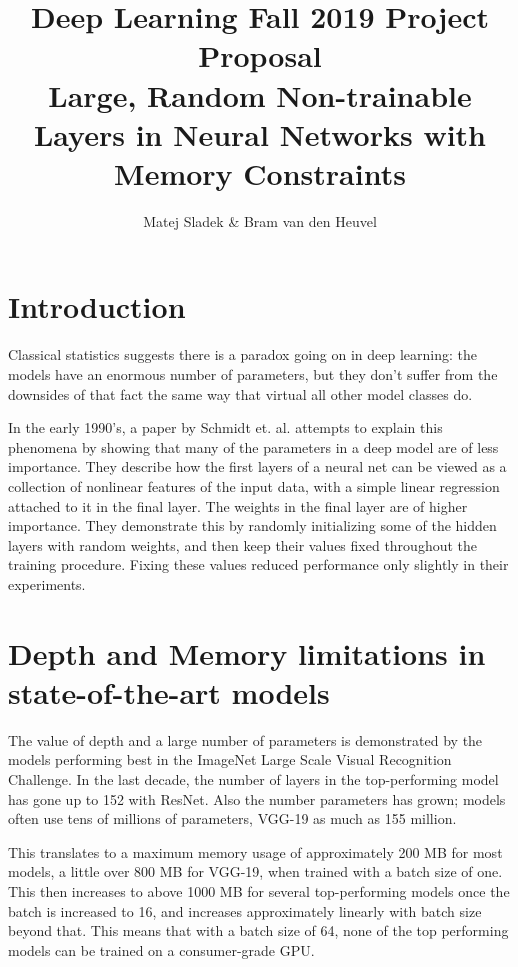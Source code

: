 \documentclass[]{article}
\title{Deep Learning Fall 2019 Project Proposal\\\large{Large, Random Non-trainable Layers in Neural Networks with Memory Constraints}}
\author{Matej Sladek \& Bram van den Heuvel}
\begin{document}
\maketitle

\begin{multicols}{2}
	\section{Introduction}
	Classical statistics suggests there is a paradox going on in deep learning: the models have an enormous number of parameters, but they don't suffer from the downsides of that fact the same way that virtual all other model classes do.
	
	In the early 1990's, a paper by Schmidt et. al. attempts to explain this phenomena by showing that many of the parameters in a deep model are of less importance. They describe how the first layers of a neural net can be viewed as a collection of nonlinear features of the input data, with a simple linear regression attached to it in the final layer. The weights in the final layer are of higher importance. They demonstrate this by randomly initializing some of the hidden layers with random weights, and then keep their values fixed throughout the training procedure. Fixing these values reduced performance only slightly in their experiments.
	
	
	\section{Depth and Memory limitations in state-of-the-art models}
	The value of depth and a large number of parameters is demonstrated by the models performing best in the ImageNet Large Scale Visual Recognition Challenge. In the last decade, the number of layers in the top-performing model has gone up to 152 with ResNet. Also the number parameters has grown; models often use tens of millions of parameters, VGG-19 as much as 155 million.
	
	This translates to a maximum memory usage of approximately 200 MB for most models, a little over 800 MB for VGG-19, when trained with a batch size of one. This then increases to above 1000 MB for several top-performing models once the batch is increased to 16, and increases approximately linearly with batch size beyond that. This means that with a batch size of 64, none of the top performing models can be trained on a consumer-grade GPU.
	

\end{multicols}
\end{document}
